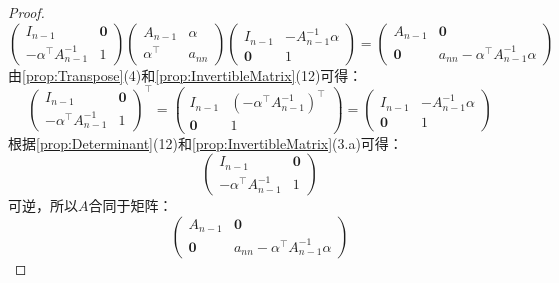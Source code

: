 \begin{proof}
	\begin{equation*}
		\begin{pmatrix}
			I_{n-1} & \mathbf{0} \\
			-\alpha^{\top}A_{n-1}^{-1} & 1
		\end{pmatrix}
		\begin{pmatrix}
			A_{n-1} & \alpha \\
			\alpha^{\top} & a_{nn}
		\end{pmatrix}
		\begin{pmatrix}
			I_{n-1} & -A_{n-1}^{-1}\alpha \\
			\mathbf{0} & 1
		\end{pmatrix}
		=
		\begin{pmatrix}
			A_{n-1} & \mathbf{0} \\
			\mathbf{0} & a_{nn}-\alpha^{\top}A_{n-1}^{-1}\alpha
		\end{pmatrix}
	\end{equation*}
	由\cref{prop:Transpose}(4)和\cref{prop:InvertibleMatrix}(12)可得：
	\begin{equation*}
		\begin{pmatrix}
			I_{n-1} & \mathbf{0} \\
			-\alpha^{\top}A_{n-1}^{-1} & 1
		\end{pmatrix}^{\top}
		=
		\begin{pmatrix}
			I_{n-1} & (-\alpha^{\top}A_{n-1}^{-1})^{\top} \\
			\mathbf{0} & 1
		\end{pmatrix}
		=
		\begin{pmatrix}
			I_{n-1} & -A_{n-1}^{-1}\alpha \\
			\mathbf{0} & 1
		\end{pmatrix}
	\end{equation*}
	根据\cref{prop:Determinant}(12)和\cref{prop:InvertibleMatrix}(3.a)可得：
	\begin{equation*}
		\begin{pmatrix}
			I_{n-1} & \mathbf{0} \\
			-\alpha^{\top}A_{n-1}^{-1} & 1
		\end{pmatrix}
	\end{equation*}
	可逆，所以$A$合同于矩阵：
	\begin{equation*}
		\begin{pmatrix}
			A_{n-1} & \mathbf{0} \\
			\mathbf{0} & a_{nn}-\alpha^{\top}A_{n-1}^{-1}\alpha
		\end{pmatrix}
	\end{equation*}

\end{proof}
